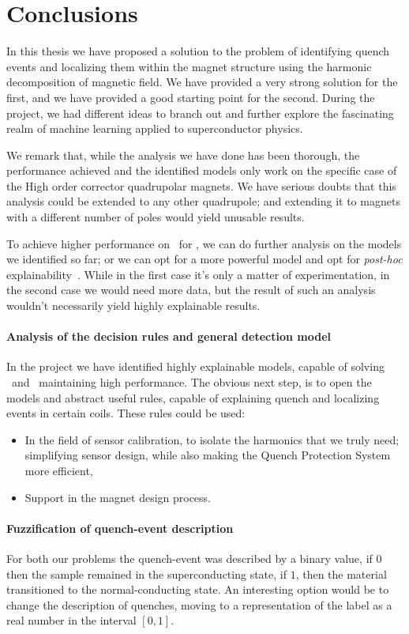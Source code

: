 \chapter{Conclusions}
\label{chp:conclusion}
In this thesis we have proposed a solution to the problem of identifying quench events and
localizing them within the magnet structure using the harmonic decomposition of magnetic field. We
have provided a very strong solution for the first, and we have provided a good starting point for
the second. During the project, we had different ideas to branch out and further explore the
fascinating realm of machine learning applied to superconductor physics.

We remark that, while the analysis we have done has been thorough, the performance achieved and the
identified models only work on the specific case of the High order corrector quadrupolar magnets.
We have serious doubts that this analysis could be extended to any other quadrupole; and extending it to magnets with a different number of poles would yield unusable results.

To achieve higher performance on \dts\ for \qlp, we can do further analysis on the models we
identified so far; or we can opt for a more powerful model and opt for \emph{post-hoc}
explainability~\cite{retzlaff2024}. While in the first case it's only a matter of experimentation,
in the second case we would need more data, but the result of such an analysis wouldn't necessarily
yield highly explainable results.

\subsubsection{Analysis of the decision rules and general detection model}
In the project we have identified highly explainable models, capable of solving \qrp\ and \qlp\
maintaining high performance. The obvious next step, is to open the models and abstract
useful rules, capable of explaining quench and localizing events in certain coils. These rules could
be used:
\begin{itemize}
	\item In the field of sensor calibration, to isolate the harmonics that we truly need; simplifying sensor design, while also making the Quench Protection System more efficient,
	\item Support in the magnet design process.
\end{itemize}

\subsubsection{Fuzzification of quench-event description}
For both our problems the quench-event was described by a binary value, if $0$ then the sample
remained in the superconducting state, if $1$, then the material transitioned to the
normal-conducting state. An interesting option would be to change the description of quenches,
moving to a representation of the label as a real number in the interval $[0, 1]$.

